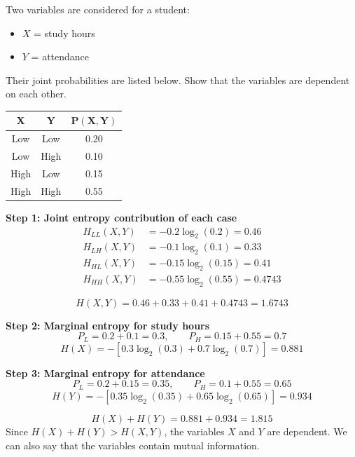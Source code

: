 \documentclass[11pt,a4paper]{book}
\newenvironment{infobox}[1][Information]{%
    \begin{tcolorbox}[
        enhanced,
        breakable,
        colback=mintgreen!10,
        colframe=mintgreen!200,
        title=#1,
        fonttitle=\bfseries,
        sharp corners,
        boxrule=0.8pt,
        left=8pt,
        right=8pt,
        top=6pt,
        bottom=6pt
    ]
}{\end{tcolorbox}}
\newcounter{qna}[chapter]
\renewcommand{\theqna}{\thechapter.\arabic{qna}}
\newenvironment{questionanswerbox}[1][Example]{%
    \refstepcounter{qna}
    \begin{tcolorbox}[
        enhanced,
        breakable,
        colback=softlavender!10,
        colframe=softlavender!200,
        title={#1~\theqna},
        fonttitle=\bfseries,
        coltitle=white,
        colbacktitle=softlavender!200,
        sharp corners,
        boxrule=1pt,
        left=8pt,
        right=8pt,
        top=6pt,
        bottom=6pt
    ]
}{\end{tcolorbox}}
\begin{document}
\begin{questionanswerbox}[Example]
Two variables are considered for a student:
\begin{itemize}
    \item $X$ = study hours
    \item $Y$ = attendance
\end{itemize}

Their joint probabilities are listed below. Show that the variables are dependent on each other.

\begin{center}
\begin{tabular}{c|c|c}
\textbf{X} & \textbf{Y} & $\mathbf{P(X,Y)}$ \\ \hline
Low  & Low  & 0.20 \\
Low  & High & 0.10 \\
High & Low  & 0.15 \\
High & High & 0.55
\end{tabular}
\end{center}

\textbf{Step 1: Joint entropy contribution of each case}
\begin{align*}
H_{LL}(X,Y) &= -0.2\log_2(0.2) = 0.46 \\
H_{LH}(X,Y) &= -0.1\log_2(0.1) = 0.33 \\
H_{HL}(X,Y) &= -0.15\log_2(0.15) = 0.41 \\
H_{HH}(X,Y) &= -0.55\log_2(0.55) = 0.4743
\end{align*}

\[
H(X,Y) = 0.46 + 0.33 + 0.41 + 0.4743 = 1.6743
\]

\textbf{Step 2: Marginal entropy for study hours}
\[
P_L = 0.2 + 0.1 = 0.3, \qquad P_H = 0.15 + 0.55 = 0.7
\]
\[
H(X) = -\left[0.3\log_2(0.3) + 0.7\log_2(0.7)\right] = 0.881
\]

\textbf{Step 3: Marginal entropy for attendance}
\[
P_L = 0.2 + 0.15 = 0.35, \qquad P_H = 0.1 + 0.55 = 0.65
\]
\[
H(Y) = -\left[0.35\log_2(0.35) + 0.65\log_2(0.65)\right] = 0.934
\]
\end{questionanswerbox}

\begin{infobox}[Conclusion]
\[
H(X) + H(Y) = 0.881 + 0.934 = 1.815
\]
Since $H(X) + H(Y) > H(X,Y)$, the variables $X$ and $Y$ are dependent. We can also say that the variables contain mutual information.
\end{infobox}

\clearpage

\end{document}
